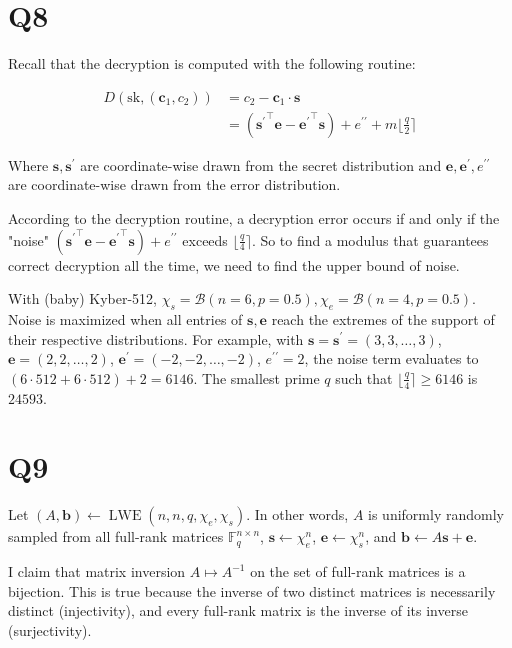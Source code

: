 \documentclass{article}
\newcommand{\round}[1]{\lfloor {#1} \rceil}
\begin{document}
\newpage

\section*{Q8}
Recall that the decryption is computed with the following routine:

$$
\begin{aligned}
D(\text{sk}, (\mathbf{c}_1, c_2))
&= c_2 - \mathbf{c}_1 \cdot \mathbf{s} \\
&= ({\mathbf{s}^\prime}^\intercal\mathbf{e} - {\mathbf{e}^\prime}^\intercal\mathbf{s}) + e^{\prime\prime} + m\round{\frac{q}{2}}
\end{aligned}
$$

Where $\mathbf{s}, \mathbf{s}^\prime$ are coordinate-wise drawn from the secret distribution and $\mathbf{e}, \mathbf{e}^\prime, e^{\prime\prime}$ are coordinate-wise drawn from the error distribution.

According to the decryption routine, a decryption error occurs if and only if the "noise" $({\mathbf{s}^\prime}^\intercal\mathbf{e} - {\mathbf{e}^\prime}^\intercal\mathbf{s}) + e^{\prime\prime}$ exceeds $\round{\frac{q}{4}}$. So to find a modulus that guarantees correct decryption all the time, we need to find the upper bound of noise.

With (baby) Kyber-512, $\chi_s = \mathcal{B}(n=6, p=0.5), \chi_e = \mathcal{B}(n=4, p=0.5)$. Noise is maximized when all entries of $\mathbf{s}, \mathbf{e}$ reach the extremes of the support of their respective distributions. For example, with $\mathbf{s} = \mathbf{s}^\prime = (3, 3, \ldots, 3)$, $\mathbf{e} = (2, 2, \ldots, 2)$, $\mathbf{e}^\prime = (-2, -2, \ldots, -2)$, $e^{\prime\prime} = 2$, the noise term evaluates to $(6 \cdot 512 + 6 \cdot 512) + 2 = 6146$. The smallest prime $q$ such that $\round{\frac{q}{4}} \geq 6146$ is $24593$.

\newpage

\section*{Q9}
Let $(A, \mathbf{b}) \leftarrow \operatorname{LWE}(n, n, q, \chi_e, \chi_s)$. In other words, $A$ is uniformly randomly sampled from all full-rank matrices $\mathbb{F}_q^{n \times n}$, $\mathbf{s} \leftarrow \chi_e^n$, $\mathbf{e} \leftarrow \chi_s^n$, and $\mathbf{b} \leftarrow A\mathbf{s} + \mathbf{e}$.

I claim that matrix inversion $A \mapsto A^{-1}$ on the set of full-rank matrices is a bijection. This is true because the inverse of two distinct matrices is necessarily distinct (injectivity), and every full-rank matrix is the inverse of its inverse (surjectivity).
\end{document}
